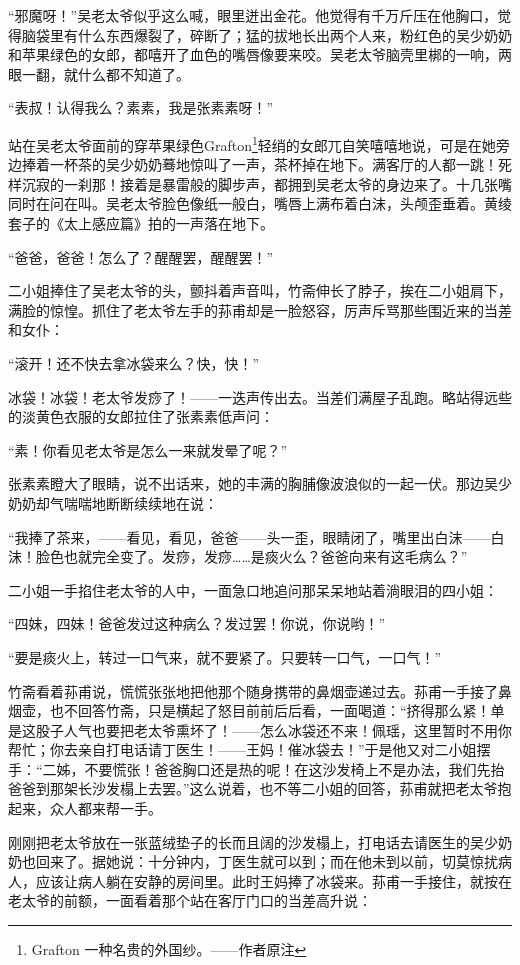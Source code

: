 \par “邪魔呀！”吴老太爷似乎这么喊，眼里迸出金花。他觉得有千万斤压在他胸口，觉得脑袋里有什么东西爆裂了，碎断了；猛的拔地长出两个人来，粉红色的吴少奶奶和苹果绿色的女郎，都嘻开了血色的嘴唇像要来咬。吴老太爷脑壳里梆的一响，两眼一翻，就什么都不知道了。
\par “表叔！认得我么？素素，我是张素素呀！”
\par 站在吴老太爷面前的穿苹果绿色Grafton\footnote{Grafton 一种名贵的外国纱。——作者原注}轻绡的女郎兀自笑嘻嘻地说，可是在她旁边捧着一杯茶的吴少奶奶蓦地惊叫了一声，茶杯掉在地下。满客厅的人都一跳！死样沉寂的一刹那！接着是暴雷般的脚步声，都拥到吴老太爷的身边来了。十几张嘴同时在问在叫。吴老太爷脸色像纸一般白，嘴唇上满布着白沫，头颅歪垂着。黄绫套子的《太上感应篇》拍的一声落在地下。
\par “爸爸，爸爸！怎么了？醒醒罢，醒醒罢！”
\par 二小姐捧住了吴老太爷的头，颤抖着声音叫，竹斋伸长了脖子，挨在二小姐肩下，满脸的惊惶。抓住了老太爷左手的荪甫却是一脸怒容，厉声斥骂那些围近来的当差和女仆：
\par “滚开！还不快去拿冰袋来么？快，快！”
\par 冰袋！冰袋！老太爷发痧了！——一迭声传出去。当差们满屋子乱跑。略站得远些的淡黄色衣服的女郎拉住了张素素低声问：
\par “素！你看见老太爷是怎么一来就发晕了呢？”
\par 张素素瞪大了眼睛，说不出话来，她的丰满的胸脯像波浪似的一起一伏。那边吴少奶奶却气喘喘地断断续续地在说：
\par “我捧了茶来，——看见，看见，爸爸——头一歪，眼睛闭了，嘴里出白沫——白沫！脸色也就完全变了。发痧，发痧……是痰火么？爸爸向来有这毛病么？”
\par 二小姐一手掐住老太爷的人中，一面急口地追问那呆呆地站着淌眼泪的四小姐：
\par “四妹，四妹！爸爸发过这种病么？发过罢！你说，你说哟！”
\par “要是痰火上，转过一口气来，就不要紧了。只要转一口气，一口气！”
\par 竹斋看着荪甫说，慌慌张张地把他那个随身携带的鼻烟壶递过去。荪甫一手接了鼻烟壶，也不回答竹斋，只是横起了怒目前前后后看，一面喝道：“挤得那么紧！单是这股子人气也要把老太爷熏坏了！——怎么冰袋还不来！佩瑶，这里暂时不用你帮忙；你去亲自打电话请丁医生！——王妈！催冰袋去！”于是他又对二小姐摆手：“二姊，不要慌张！爸爸胸口还是热的呢！在这沙发椅上不是办法，我们先抬爸爸到那架长沙发榻上去罢。”这么说着，也不等二小姐的回答，荪甫就把老太爷抱起来，众人都来帮一手。
\par 刚刚把老太爷放在一张蓝绒垫子的长而且阔的沙发榻上，打电话去请医生的吴少奶奶也回来了。据她说：十分钟内，丁医生就可以到；而在他未到以前，切莫惊扰病人，应该让病人躺在安静的房间里。此时王妈捧了冰袋来。荪甫一手接住，就按在老太爷的前额，一面看着那个站在客厅门口的当差高升说：
